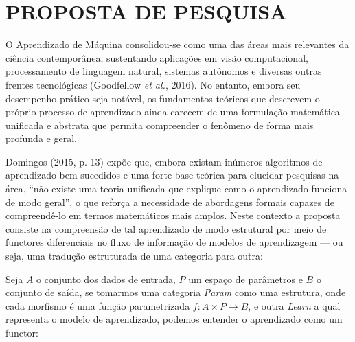 \documentclass[12pt,a4paper]{article}
\begin{document}
\begin{enumerate}
\begin{enumerate}
\begin{enumerate}
            \begin{center}
            \end{center}

            
        \end{enumerate}
    \end{enumerate}
\end{enumerate}


\section{PROPOSTA DE PESQUISA}
\label{sec:tema}

O Aprendizado de Máquina consolidou-se como uma das áreas mais relevantes da ciência contemporânea, sustentando aplicações em visão computacional, processamento de linguagem natural, sistemas autônomos e diversas outras frentes tecnológicas (Goodfellow \textit{et al.}, 2016). No entanto, embora seu desempenho prático seja notável, os fundamentos teóricos que descrevem o próprio processo de aprendizado ainda carecem de uma formulação matemática unificada e abstrata que permita compreender o fenômeno de forma mais profunda e geral.

Domingos (2015, p. 13) expõe que, embora existam inúmeros algoritmos de aprendizado bem-sucedidos e uma forte base teórica para elucidar pesquisas na área, “não existe uma teoria unificada que explique como o aprendizado funciona de modo geral”, o que reforça a necessidade de abordagens formais capazes de compreendê-lo em termos matemáticos mais amplos. Neste contexto a proposta consiste na compreensão de tal aprendizado de modo estrutural por meio de functores diferenciais no fluxo de informação de modelos de aprendizagem — ou seja, uma tradução estruturada de uma categoria para outra:

Seja $A$ o conjunto dos dados de entrada, $P$ um espaço de parâmetros e $B$ o conjunto de saída, se tomarmos uma categoria \textit{Param} como uma estrutura, onde cada morfismo é uma função parametrizada $f: A \times P \to B$, e outra \textit{Learn} a qual representa o modelo de aprendizado, podemos entender o aprendizado como um functor:
\end{document}
